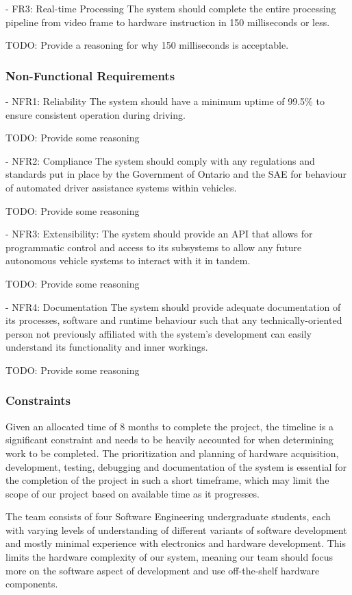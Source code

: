\documentclass[titlepage]{article}
\begin{document}
- FR3: Real-time Processing
The system should complete the entire processing pipeline from video frame to hardware instruction in 150 milliseconds or less.

TODO: Provide a reasoning for why 150 milliseconds is acceptable.

\subsubsection{Non-Functional Requirements}
- NFR1: Reliability
The system should have a minimum uptime of 99.5\% to ensure consistent operation during driving.

TODO: Provide some reasoning

- NFR2: Compliance
The system should comply with any regulations and standards put in place by the Government of Ontario and the SAE for behaviour of automated driver assistance systems within vehicles.

TODO: Provide some reasoning

- NFR3: Extensibility:
The system should provide an API that allows for programmatic control and access to its subsystems to allow any future autonomous vehicle systems to interact with it in tandem.

TODO: Provide some reasoning

- NFR4: Documentation
The system should provide adequate documentation of its processes, software and runtime behaviour such that any technically-oriented person not previously affiliated with the system’s development can easily understand its functionality and inner workings.

TODO: Provide some reasoning


\subsubsection{Constraints}

Given an allocated time of 8 months to complete the project, the timeline is a significant constraint and needs to be heavily accounted for when determining work to be completed. The prioritization and planning of hardware acquisition, development, testing, debugging and documentation of the system is essential for the completion of the project in such a short timeframe, which may limit the scope of our project based on available time as it progresses.

The team consists of four Software Engineering undergraduate students, each with varying levels of understanding of different variants of software development and mostly minimal experience with electronics and hardware development. This limits the hardware complexity of our system, meaning our team should focus more on the software aspect of development and use off-the-shelf hardware components.
\end{document}
